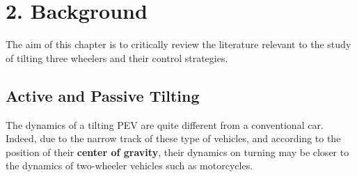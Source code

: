 \chapter{2. Background}

The aim of this chapter is to critically review the literature relevant to the study of tilting three wheelers and their control strategies.

\section{Active and Passive Tilting}

The dynamics of a tilting PEV are quite different from a conventional car. Indeed, due to the narrow track of these type of vehicles, and according to the position of their \textbf{center of gravity}, their dynamics on turning may be closer to the dynamics of two-wheeler vehicles such as motorcycles.

